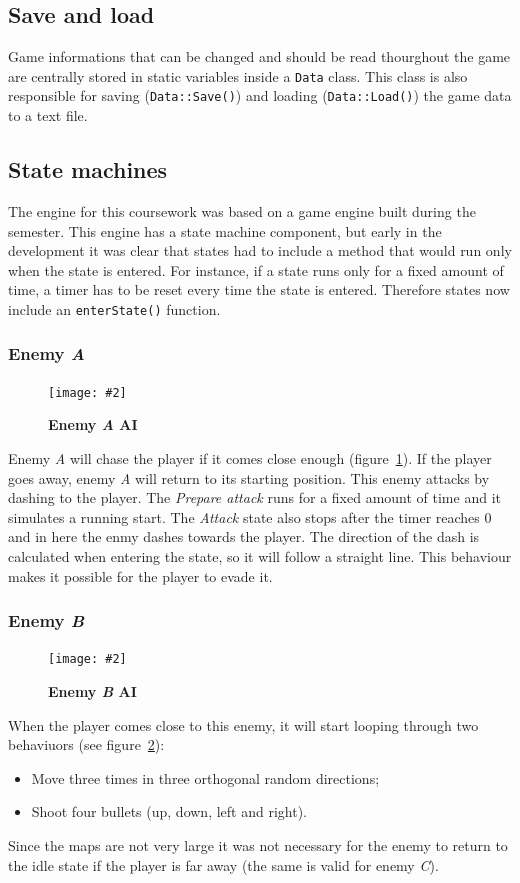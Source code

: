 \documentclass[10pt, a4paper]{article}
\newcommand{\figuremacro}[5]{
    \begin{figure}[#1]
        \centering
        \texttt{[image: \#2]}
        \caption[#3]{\textbf{#3}#4}
        \label{fig:#2}
    \end{figure}
}
\begin{document}
    \subsection{Save and load}
    Game informations that can be changed and should be read thourghout the game are centrally stored in static variables inside a \texttt{Data} class. This class is also responsible for saving (\texttt{Data::Save()}) and loading (\texttt{Data::Load()}) the game data to a text file.
    
    \subsection{State machines}
    The engine for this coursework was based on a game engine built during the semester. This engine has a state machine component, but early in the development it was clear that states had to include a method that would run only when the state is entered. For instance, if a state runs only for a fixed amount of time, a timer has to be reset every time the state is entered. Therefore states now include an \texttt{enterState()} function.
    
    \subsubsection{Enemy \textit{A}}
    \figuremacro{h}{EnemyA}{Enemy \textit{A} AI}{}{1.0}
    Enemy \textit{A} will chase the player if it comes close enough (figure~\ref{fig:EnemyA}). If the player goes away, enemy \textit{A} will return to its starting position. This enemy attacks by dashing to the player. The \textit{Prepare attack} runs for a fixed amount of time and it simulates a running start. The \textit{Attack} state also stops after the timer reaches 0 and in here the enmy dashes towards the player. The direction of the dash is calculated when entering the state, so it will follow a straight line. This behaviour makes it possible for the player to evade it.
    
    \subsubsection{Enemy \textit{B}}
    \figuremacro{h}{EnemyB}{Enemy \textit{B} AI}{}{1.0}
    When the player comes close to this enemy, it will start looping through two behaviuors (see figure~\ref{fig:EnemyB}):
    \begin{itemize}
    	\item Move three times in three orthogonal random directions;
    	\item Shoot four bullets (up, down, left and right).
    \end{itemize}
	Since the maps are not very large it was not necessary for the enemy to return to the idle state if the player is far away (the same is valid for enemy \textit{C}).
    
\end{document}
